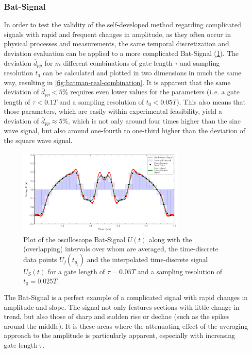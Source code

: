\subsubsection{Bat-Signal} \label{sssec:Bat-Signal}
In order to test the validity of the self-developed method regarding complicated signals with rapid and frequent changes in amplitude, as they often occur in physical processes and measurements, the same temporal discretization and deviation evaluation can be applied to a more complicated Bat-Signal (\cref{fig:batman-real-i500-s250}). The deviation $\overline{d}_{pp}$ for $m$ different combinations of gate length $\tau$ and sampling resolution $t_0$ can be calculated and plotted in two dimensions in much the same way, resulting in \cref{fig:batman-real-combination}. It is apparent that the same deviation of $\overline{d}_{pp} < 5\%$ requires even lower values for the parameters (i.\,e. a gate length of $\tau < 0.1T$ and a sampling resolution of $t_0 < 0.05T$). This also means that those parameters, which are easily within experimental feasibility, yield a deviation of $\overline{d}_{pp} \approx 5\%$, which is not only around four times higher than the sine wave signal, but also around one-fourth to one-third higher than the deviation of the square wave signal.
\begin{figure}[H]
	\centering
	\includegraphics[width=0.75\textwidth]{Figures/Signals/batman_real_i500_s250.pdf}
	\caption{Plot of the oscilloscope Bat-Signal $U\left(t\right)$ along with the (overlapping) intervals over whom are averaged, the time-discrete data points $\overline{U}_j\left(t_{g_j}\right)$ and the interpolated time-discrete signal $U_S\left(t\right)$ for a gate length of $\tau = 0.05T$ and a sampling resolution of $t_0 = 0.025T$.}
	\label{fig:batman-real-i500-s250}
\end{figure}
The Bat-Signal is a perfect example of a complicated signal with rapid changes in amplitude and slope. The signal not only features sections with little change in trend, but also those of sharp and sudden rise or decline (such as the spikes around the middle). It is these areas where the attenuating effect of the averaging approach to the amplitude is particularly apparent, especially with increasing gate length $\tau$.
